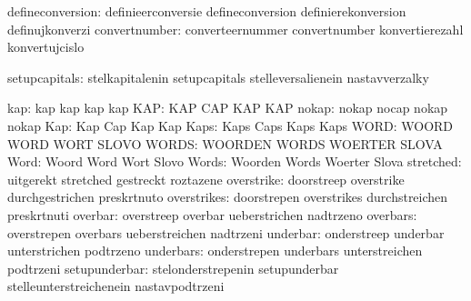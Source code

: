              defineconversion:  definieerconversie           defineconversion
                                definierekonversion          definujkonverzi
                convertnumber:  converteernummer             convertnumber
                                konvertierezahl              konvertujcislo

                setupcapitals:  stelkapitalenin              setupcapitals 
                                stelleversalienein           nastavverzalky

                          kap:  kap                          kap
                                kap                          kap
                          KAP:  KAP                          CAP
                                KAP                          KAP
                        nokap:  nokap                        nocap
                                nokap                        nokap
                          Kap:  Kap                          Cap
                                Kap                          Kap
                         Kaps:  Kaps                         Caps
                                Kaps                         Kaps
                         WORD:  WOORD                        WORD
                                WORT                         SLOVO
                        WORDS:  WOORDEN                      WORDS
                                WOERTER                      SLOVA
                         Word:  Woord                        Word
                                Wort                         Slovo
                        Words:  Woorden                      Words
                                Woerter                      Slova
                    stretched:  uitgerekt                    stretched
                                gestreckt                    roztazene
                   overstrike:  doorstreep                   overstrike
                                durchgestrichen              preskrtnuto
                  overstrikes:  doorstrepen                  overstrikes
                                durchstreichen               preskrtnuti
                      overbar:  overstreep                   overbar
                                ueberstrichen                nadtrzeno
                     overbars:  overstrepen                  overbars
                                ueberstreichen               nadtrzeni
                     underbar:  onderstreep                  underbar
                                unterstrichen                podtrzeno
                    underbars:  onderstrepen                 underbars
                                unterstreichen               podtrzeni
                setupunderbar:  stelonderstrepenin           setupunderbar
                                stelleunterstreichenein      nastavpodtrzeni

